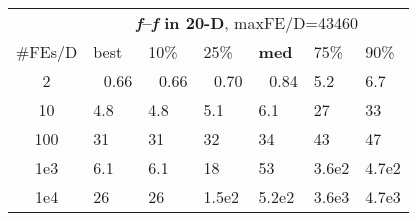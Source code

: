 \begin{tabular}{c|llllll}
 & \multicolumn{6}{|c}{\textbf{\textit{f}\raisebox{-0.35ex}{1}--\textit{f}\raisebox{-0.35ex}{3} in 20-D}, maxFE/D=43460}\\
\#FEs/D & best & 10\% & 25\% & \textbf{med} & 75\% & 90\%\\
2 & ~\,0.66 & ~\,0.66 & ~\,0.70 & ~\,0.84 & \hspace*{1ex}5.2 & \hspace*{1ex}6.7\\
10 & \hspace*{1ex}4.8 & \hspace*{1ex}4.8 & \hspace*{1ex}5.1 & \hspace*{1ex}6.1 & 27 & 33\\
100 & 31 & 31 & 32 & 34 & 43 & 47\\
1e3 & \hspace*{1ex}6.1 & \hspace*{1ex}6.1 & 18 & 53 & 3.6e2 & 4.7e2\\
1e4 & 26 & 26 & 1.5e2 & 5.2e2 & 3.6e3 & 4.7e3
\end{tabular}
